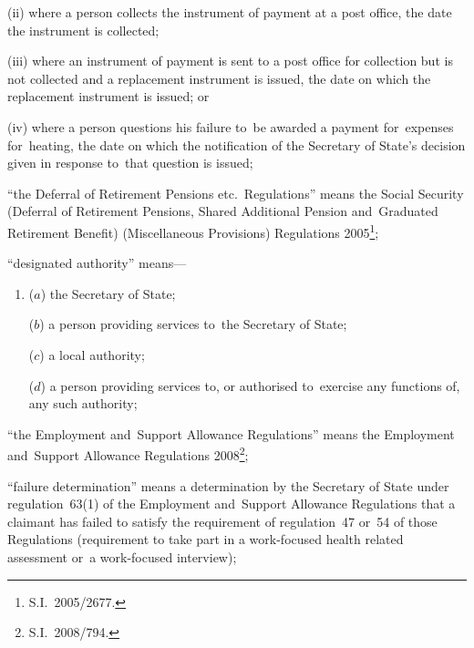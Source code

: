 \documentclass[12pt,a4paper]{article}
\begin{document}
\begin{enumerate}
\begin{enumerate}
\begin{enumerate}
(ii) where a person collects the instrument of payment at a post office, the date the instrument is collected;

(iii) where an instrument of payment is sent to a post office for collection but is not collected and a replacement instrument is issued, the date on which the replacement instrument is issued; or

(iv) where a person questions his failure to~be awarded a payment for~expenses for~heating, the date on which the notification of the Secretary of State’s decision given in response to~that question is issued;
\end{enumerate}
\end{enumerate}

“the Deferral of Retirement Pensions etc.\ Regulations” means the Social Security (Deferral of Retirement Pensions, Shared Additional Pension and~Graduated Retirement Benefit) (Miscellaneous Provisions) Regulations 2005\footnote{S.I.~2005/2677.};


“designated authority” means—
\begin{enumerate}\item[]
    ($a$)     the Secretary of State;

    ($b$) 
    a person providing services to~the Secretary of State;

    ($c$) 
    a local authority;

    ($d$) 
    a person providing services to, or authorised to~exercise any functions of, any such authority;
\end{enumerate}

“the Employment and~Support Allowance Regulations” means the Employment and~Support Allowance Regulations 2008\footnote{S.I.~2008/794.};

“failure determination” means a determination by the Secretary of State under regulation~63(1) of the Employment and~Support Allowance Regulations that a claimant has failed to satisfy the requirement of regulation~47 or~54 of those Regulations (requirement to take part in a work-focused health related assessment or~a work-focused interview);


\end{enumerate}
\end{document}

